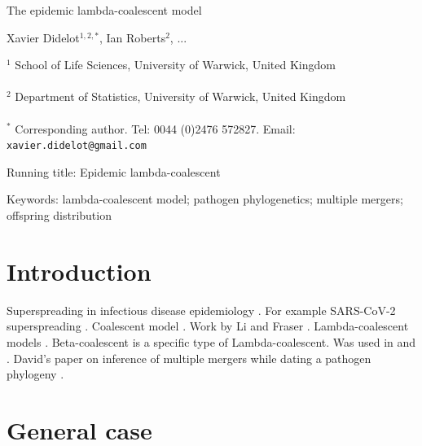\documentclass{article}
\begin{document}
{\Large The epidemic lambda-coalescent model}


\vspace*{2cm}
Xavier Didelot$^{1,2,*}$, Ian Roberts$^{2}$, ...

\vspace*{2cm}
$^1$ School of Life Sciences, University of Warwick, United Kingdom\\\\
$^2$ Department of Statistics, University of Warwick, United Kingdom\\\\
$^*$ Corresponding author. Tel: 0044 (0)2476 572827. Email: \verb+xavier.didelot@gmail.com+

\vspace*{2cm}
Running title: Epidemic lambda-coalescent

\vspace*{2cm}
Keywords: lambda-coalescent model; pathogen phylogenetics; multiple mergers; offspring distribution


\newpage
\section{Introduction}

Superspreading in infectious disease epidemiology \citep{Lloyd-Smith2005}.
For example SARS-CoV-2 superspreading \citep{Wang2020,lemieuxPhylogeneticAnalysisSARSCoV22021,gomez-carballaSuperspreadingEmergenceCOVID192021}.
Coalescent model \citep{Kingman1982,Kingman1982a}.
Work by Li and Fraser \citep{Li2017,Fraser2017}.
Lambda-coalescent models \citep{pitmanCoalescentsMultipleCollisions1999,sagitovGeneralCoalescentAsynchronous1999,donnellyParticleRepresentationsMeasureValued1999}. 
Beta-coalescent \citep{schweinsbergCoalescentProcessesObtained2003} is a specific type of Lambda-coalescent. 
Was used in \citep{Hoscheit2019} and \citep{Menardo2021}. 
David's paper on inference of multiple mergers while dating a pathogen phylogeny \citep{Helekal2024}.

\section{General case}
\end{document}
